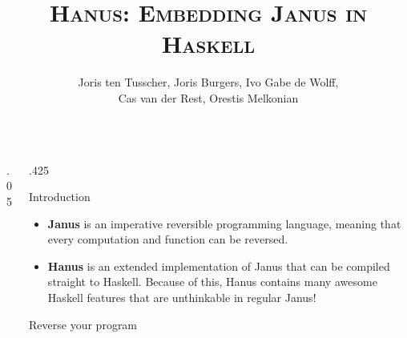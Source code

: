 \documentclass[final,hyperref={pdfpagelabels=false}]{beamer}
\title{\LARGE \textsc{Hanus: Embedding Janus in Haskell}} %
\author{\vspace{1cm} Joris ten Tusscher, Joris Burgers, Ivo Gabe de Wolff,\\ Cas van der Rest, Orestis Melkonian\vspace{1cm}} %
\institute{\Large \emph{Faculty of Science, Utrecht University}} %
\newcommand\sepsize{.05\textwidth}
\newcommand\colsize{.425\textwidth}
\begin{document}

\begin{frame}[t] %

\begin{columns}[t] %

\begin{column}{\sepsize}\end{column} %

\begin{column}{\colsize} %


\begin{block}{Introduction}
	\begin{itemize}
		\item \textbf{Janus} is an imperative reversible programming language, meaning that every computation and function can be reversed.
 		\item \textbf{Hanus} is an extended implementation of Janus that can be compiled straight to Haskell. Because of this, Hanus contains many awesome Haskell features that are unthinkable in regular Janus!
	\end{itemize}
\end{block}

\begin{block}{Reverse your program}
	\begin{itemize}


\end{itemize}
\end{block}
\end{column}
\end{columns}
\end{frame}
\end{document}
